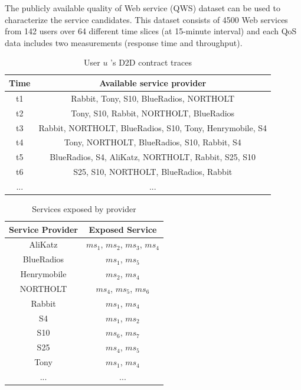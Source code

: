 \documentclass[10pt,journal,compsoc]{IEEEtran}
\begin{document}
The publicly available quality of Web service (QWS) dataset\cite{zheng2014investigating} can be used to characterize the service candidates. This dataset consists of 4500 Web services from 142 users over 64 different time slices (at 15-minute interval) and each QoS data includes two measurements (response time and throughput).

\begin{table}[!t]
\renewcommand{\arraystretch}{1.5}
\caption{User $u$ 's D2D contract traces}
\label{D2D contract traces}
\centering
\begin{tabular}{c c}
\hline
\bfseries Time & \bfseries Available service provider\\
\hline
t1 & Rabbit, Tony, S10, BlueRadios, NORTHOLT\\
t2 & Tony, S10, Rabbit, NORTHOLT, BlueRadios\\
t3 & Rabbit, NORTHOLT, BlueRadios, S10, Tony, Henrymobile, S4 \\
t4 & Tony, NORTHOLT, BlueRadios, S10, Rabbit, S4\\
t5 & BlueRadios, S4, AliKatz, NORTHOLT, Rabbit, S25, S10\\
t6 & S25, S10, NORTHOLT, BlueRadios, Rabbit\\
... & ...\\
\hline
\end{tabular}
\end{table}

\begin{table}[!t]
\renewcommand{\arraystretch}{1.3}
\caption{Services exposed by provider}
\label{Services exposed by provider}
\centering
\begin{tabular}{c c}
\hline
\bfseries Service Provider & \bfseries Exposed Service\\
\hline
AliKatz     & $ms_1$, $ms_2$, $ms_3$, $ms_4$\\
BlueRadios  & $ms_1$, $ms_5$\\
Henrymobile & $ms_2$, $ms_4$\\
NORTHOLT    & $ms_4$, $ms_5$, $ms_6$ \\
Rabbit      & $ms_1$, $ms_4$\\
S4          & $ms_1$, $ms_2$\\
S10         & $ms_6$, $ms_7$\\
S25         & $ms_4$, $ms_5$\\
Tony        & $ms_1$, $ms_4$\\
... & ...\\
\hline
\end{tabular}
\end{table}
\end{document}
